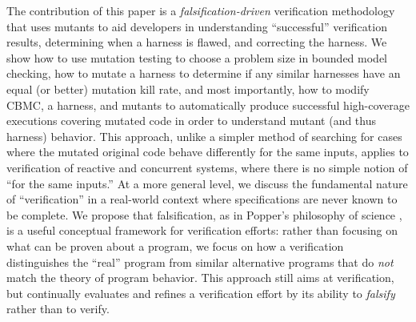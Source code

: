 \documentclass[conference]{IEEEtran}
\begin{document}

The contribution of this paper is a \emph{falsification-driven}
verification methodology that uses mutants to aid developers 
 in understanding ``successful'' verification
results, determining when a harness is flawed, and correcting the harness.
We show how to use mutation testing to
choose a problem size in bounded model checking, how to mutate a
harness to determine if any similar harnesses have an equal (or
better) mutation kill rate, and most importantly, how to modify CBMC,
a harness, and mutants to automatically produce successful
  high-coverage executions covering mutated code in order to
understand mutant (and thus harness) behavior.  This
approach, unlike a simpler method of searching for cases where the
mutated original code behave differently for the same inputs,
applies to verification of reactive and concurrent systems, where
there is no simple notion of ``for the same inputs.''  
At a more general level, we discuss the fundamental nature of
``verification'' in a real-world context where specifications are
never known to be complete. We propose that falsification, as in
Popper's philosophy of science \cite{Popper}, is a useful conceptual
framework for verification efforts: rather than focusing on what can
be proven about a program, we focus on how a
verification distinguishes the ``real'' program from similar
alternative programs that do \emph{not} match the theory of program
behavior.  This approach still aims at verification, but continually
evaluates and refines a verification effort by its ability to
\emph{falsify} rather than to verify.
\end{document}

